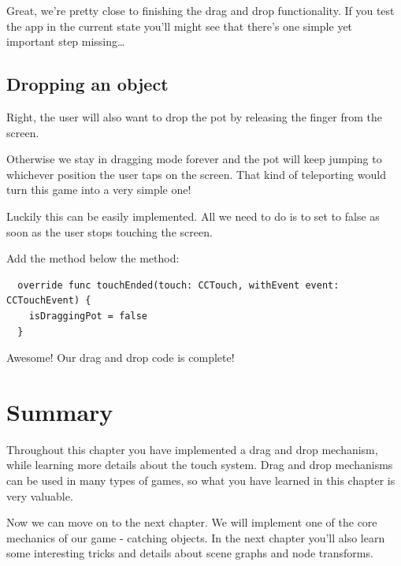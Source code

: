 Great, we're pretty close to finishing the drag and drop functionality. If you
test the app in the current state you'll might see that there's one simple yet
important step missing\ldots

\subsection{Dropping an object}
Right, the user will also want to drop the pot by releasing the finger from the
screen. 

Otherwise we stay in dragging mode forever and the pot will keep jumping
to whichever position the user taps on the screen. That kind of teleporting
would turn this game into a very simple one!

Luckily this can be easily implemented. All we need to do is to set
 to false as soon as the user stops touching the
screen.
\begin{leftbar}
Add the  method below the  method:
\begin{lstlisting}
  override func touchEnded(touch: CCTouch, withEvent event: CCTouchEvent) {
    isDraggingPot = false
  }
\end{lstlisting}
\end{leftbar}
Awesome! Our drag and drop code is complete! 

\section{Summary} 
Throughout this chapter you have implemented a drag and drop mechanism, while
learning more details about the \cocos{} touch system. Drag and drop mechanisms
can be used in many types of games, so what you have learned in this chapter is very valuable.

Now we can move on to the next chapter. We will implement one of the core
mechanics of our game - catching objects. In the next chapter you'll also learn
some interesting tricks and details about scene graphs and node transforms.